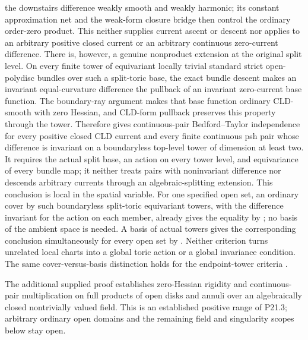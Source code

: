 the downstairs difference weakly smooth and weakly harmonic; its constant
approximation net and the weak-form closure bridge then control the ordinary
order-zero product.  This neither supplies current ascent or descent nor
applies to an arbitrary positive closed current or an arbitrary continuous
zero-current difference.
There is, however, a genuine nonproduct extension at the original split
level.  On every finite tower of equivariant locally trivial standard strict
open-polydisc bundles over such a split-toric base, the exact bundle descent
makes an invariant equal-curvature difference the pullback of an invariant
zero-current base function.  The boundary-ray argument makes that base
function ordinary CLD-smooth with zero Hessian, and CLD-form pullback
preserves this property through the tower.  Therefore
 gives
continuous-pair Bedford--Taylor independence for every positive closed CLD
current and every finite continuous psh pair whose difference is invariant
on a boundaryless top-level tower of dimension at least two.  It requires the
actual split base, an action on every tower level, and equivariance of every
bundle map; it neither treats pairs with noninvariant difference nor descends
arbitrary currents through an algebraic-splitting extension.
This conclusion is local in the spatial variable.  For one specified open
set, an ordinary cover by such boundaryless split-toric equivariant towers,
with the difference invariant for the action on each member, already gives
the equality by
; no basis of the
ambient space is needed.  A basis of actual towers gives the corresponding
conclusion simultaneously for every open set by
.  Neither
criterion turns unrelated local charts into a global toric action or a global
invariance condition.  The same cover-versus-basis distinction holds for the
endpoint-tower criteria
.

The additional supplied proof
 establishes zero-Hessian
rigidity and continuous-pair multiplication on full products of open disks
and annuli over an algebraically closed nontrivially valued field. This
is an established positive range of P21.3; arbitrary ordinary open domains
and the remaining field and singularity scopes below stay open.

